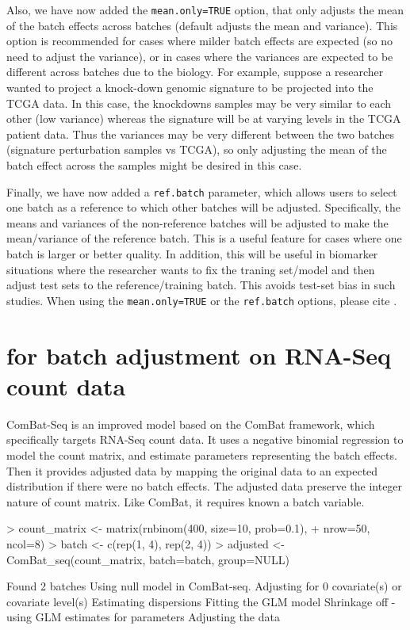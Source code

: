 \documentclass[12pt]{article}
\begin{document}
Also, we have now added the \texttt{mean.only=TRUE} option, that only adjusts the mean of the batch effects across batches (default adjusts the mean and variance). This option is recommended for cases where milder batch effects are expected (so no need to adjust the variance), or in cases where the variances are expected to be different across batches due to the biology. For example, suppose a researcher wanted to project a knock-down genomic signature to be projected into the TCGA data. In this case, the knockdowns samples may be very similar to each other (low variance) whereas the signature will be at varying levels in the TCGA patient data. Thus the variances may be very different between the two batches (signature perturbation samples vs TCGA), so only adjusting the mean of the batch effect across the samples might be desired in this case.

Finally, we have now added a \texttt{ref.batch} parameter, which allows users to select one batch as a reference to which other batches will be adjusted. Specifically, the means and variances of the non-reference batches will be adjusted to make the mean/variance of the reference batch. This is a useful feature for cases where one batch is larger or better quality. In addition, this will be useful in biomarker situations where the researcher wants to fix the traning set/model and then adjust test sets to the reference/training batch. This avoids test-set bias in such studies.  
When using the \texttt{mean.only=TRUE} or the \texttt{ref.batch} options, please cite \cite{zhang2018alternative}.


\section{ for batch adjustment on RNA-Seq count data} 

ComBat-Seq is an improved model based on the ComBat framework, which specifically targets RNA-Seq count data. It uses a negative binomial regression to model the count matrix, and estimate parameters representing the batch effects. Then it provides adjusted data by mapping the original data to an expected distribution if there were no batch effects. The adjusted data preserve the integer nature of count matrix. Like ComBat, it requires known a batch variable.

\begin{Schunk}
\begin{Sinput}
> count_matrix <- matrix(rnbinom(400, size=10, prob=0.1), 
+                        nrow=50, ncol=8)
> batch <- c(rep(1, 4), rep(2, 4))
> adjusted <- ComBat_seq(count_matrix, batch=batch, group=NULL)
\end{Sinput}
\begin{Soutput}
Found 2 batches
Using null model in ComBat-seq.
Adjusting for 0 covariate(s) or covariate level(s)
Estimating dispersions
Fitting the GLM model
Shrinkage off - using GLM estimates for parameters
Adjusting the data
\end{Soutput}
\end{Schunk}
  
\end{document}
